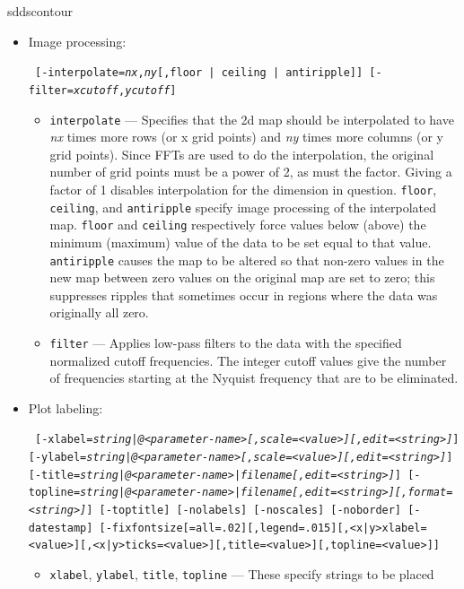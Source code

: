 \begin{sddsprog}{sddscontour}
\begin{itemize}
        at the extremes would coincide with the edge of the plot.
    \item Image processing:
\begin{flushleft}{\tt
[-interpolate={\em nx},{\em ny}[,{floor | ceiling | antiripple}]] [-filter={\em xcutoff},{\em ycutoff}]
}\end{flushleft}
        \begin{itemize}
        \item \verb|interpolate| --- Specifies that the 2d map should be interpolated to have {\em nx} times
        more rows (or x grid points) and {\em ny} times more columns (or y grid points).  Since FFTs are used to
        do the interpolation, the original number of grid points must be a power of 2, as must the factor.  Giving
        a factor of 1 disables interpolation for the dimension in question.  \verb|floor|, \verb|ceiling|,
        and \verb|antiripple| specify image processing of the interpolated map.  \verb|floor| and \verb|ceiling|
        respectively force values below (above) the minimum (maximum) value of the data to be set equal to that
        value.  \verb|antiripple| causes the map to be altered so that non-zero values in the new map between
        zero values on the original map are set to zero; this suppresses ripples that sometimes occur in regions
        where the data was originally all zero.
        \item \verb|filter| --- Applies low-pass filters to the data with the specified normalized cutoff
        frequencies.  The integer cutoff values give the number of frequencies starting at the Nyquist frequency
        that are to be eliminated.
        \end{itemize}
    \item Plot labeling:
\begin{flushleft}{\tt
[-xlabel={\em string|@<parameter-name>[,scale=<value>][,edit=<string>]}]
[-ylabel={\em string|@<parameter-name>[,scale=<value>][,edit=<string>]}]
[-title={\em string|@<parameter-name>|filename[,edit=<string>]}]
[-topline={\em string|@<parameter-name>|filename[,edit=<string>][,format=<string>]}]
[-toptitle] [-nolabels] [-noscales] [-noborder] [-datestamp]
[-fixfontsize[=all=.02][,legend=.015][,<x|y>xlabel=<value>][,<x|y>ticks=<value>][,title=<value>][,topline=<value>]]
}\end{flushleft}
        \begin{itemize}
        \item \verb|xlabel|, \verb|ylabel|, \verb|title|, \verb|topline| --- These specify strings to be placed

\end{itemize}
\end{itemize}
\end{sddsprog}
